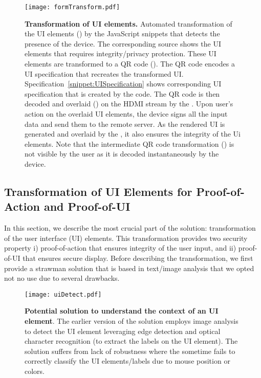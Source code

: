\begin{figure*}[t]
\centering
\texttt{[image: formTransform.pdf]}
\caption{\textbf{Transformation of UI elements.} Automated transformation of the UI elements (\one) by the \name JavaScript snippets that detects the presence of the device. The corresponding \html source shows the UI elements that requires integrity/privacy protection. These UI elements are transformed to a QR code (\two). The QR code encodes a UI specification that recreates the transformed UI. Specification~\ref{snippet:UISpecification} shows corresponding UI specification that is created by the \name \js code. The QR code is then decoded and overlaid (\three) on the HDMI stream by the \device. Upon user's action on the overlaid UI elements, the device signs all the input data and send them to the remote server. As the rendered UI is generated and overlaid by the \device, it also ensures the integrity of the Ui elements. Note that the intermediate QR code transformation (\two) is not visible by the user as it is decoded instantaneously by the device.}
\label{fig:transformation}
\end{figure*}


\subsection{Transformation of UI Elements for Proof-of-Action and Proof-of-UI}
\label{sec:systemDesign:transformation}


In this section, we describe the most crucial part of the \name solution: transformation of the user interface (UI) elements. This transformation provides two security property i) proof-of-action that ensures integrity of the user input, and ii) proof-of-UI that ensures secure display. Before describing the transformation, we first provide a strawman solution that is based in text/image analysis that we opted not no use due to several drawbacks.   

\begin{figure}[!htpb]
\centering
\texttt{[image: uiDetect.pdf]}
\caption{\textbf{Potential solution to understand the context of an UI element}. The earlier version of the \name solution employs image analysis to detect the UI element leveraging edge detection and optical character recognition (to extract the labels on the UI element). The solution suffers from lack of robustness where the \device sometime fails to correctly classify the UI elements/labels due to mouse position or colors.}
\label{fig:uiDetect}
\centering
\end{figure}

